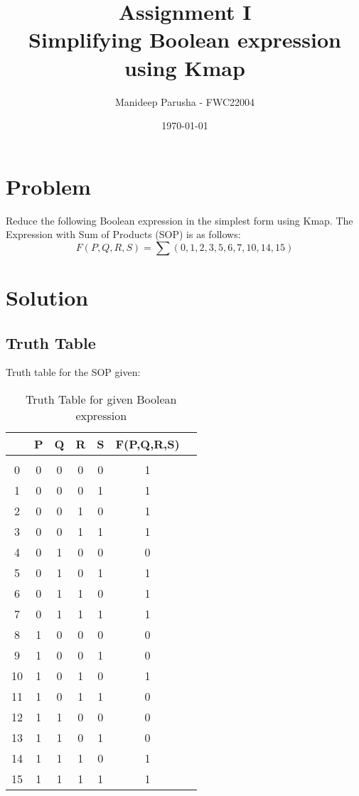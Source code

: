 \documentclass[journal,12pt,twocolumn]{IEEEtran}
\title{Assignment \textrm{I} \textbf{\\Simplifying Boolean expression using Kmap}}
\author{Manideep Parusha - FWC22004}
\date{\today}
\begin{document}
\maketitle

\tableofcontents

\section{Problem}
Reduce the following Boolean expression in the simplest form using Kmap. The Expression with Sum of Products (SOP) is as follows:
$$ {F(P,Q,R,S) = \sum (0,1,2,3,5,6,7,10,14,15)}$$

\section{Solution}

\subsection{Truth Table}
Truth table for the SOP given:
\begin{table}[h!]
    \centering
    
    \begin{tabular}[20pt]{|c|c|c|c|c|c|c|}
          \hline
          &P&Q&R&S&F(P,Q,R,S) 
          \\ \hline & & & & & 
          \\ 0&0&0&0&0&1
          \\ 1&0&0&0&1&1
          \\ 2&0&0&1&0&1
          \\ 3&0&0&1&1&1
          \\ 4&0&1&0&0&0
          \\ 5&0&1&0&1&1
          \\ 6&0&1&1&0&1
          \\ 7&0&1&1&1&1
          \\ 8&1&0&0&0&0
          \\ 9&1&0&0&1&0
          \\ 10&1&0&1&0&1
          \\ 11&1&0&1&1&0
          \\ 12&1&1&0&0&0
          \\ 13&1&1&0&1&0
          \\ 14&1&1&1&0&1
          \\ 15&1&1&1&1&1     
          \\ \hline
              \end{tabular}
            \vspace{9pt}
    \caption{Truth Table for given Boolean expression}
    \label{Truthtable}
\end{table}
\end{document}
